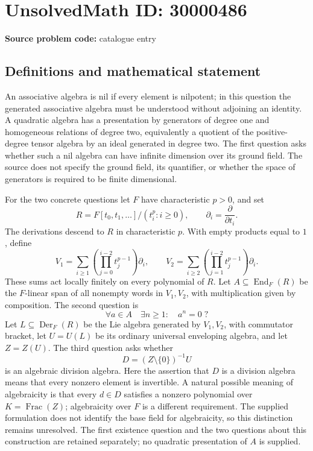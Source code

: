\documentclass[11pt]{article}
\begin{document}
\section*{UnsolvedMath ID: 30000486}
\textbf{Source problem code:} catalogue entry
\subsection{Definitions and mathematical statement}
An associative algebra is nil if every element is nilpotent; in this question the generated associative algebra must be understood without adjoining an identity. A quadratic algebra has a presentation by generators of degree one and homogeneous relations of degree two, equivalently a quotient of the positive-degree tensor algebra by an ideal generated in degree two. The first question asks whether such a nil algebra can have infinite dimension over its ground field. The source does not specify the ground field, its quantifier, or whether the space of generators is required to be finite dimensional.

For the two concrete questions let $F$ have characteristic $p>0$, and set
\[
R=F[t_0,t_1,\ldots]/(t_i^p:i\geq0),\qquad \partial_i=\frac{\partial}{\partial t_i}.
\]
The derivations descend to $R$ in characteristic $p$. With empty products equal to $1$, define
\[
V_1=\sum_{i\geq1}\left(\prod_{j=0}^{i-2}t_j^{p-1}\right)\partial_i,
\qquad
V_2=\sum_{i\geq2}\left(\prod_{j=1}^{i-2}t_j^{p-1}\right)\partial_i.
\]
These sums act locally finitely on every polynomial of $R$. Let $A\subseteq\operatorname{End}_F(R)$ be the $F$-linear span of all nonempty words in $V_1,V_2$, with multiplication given by composition. The second question is
\[
\forall a\in A\quad\exists n\geq1:\quad a^n=0\;?
\]
Let $L\subseteq\operatorname{Der}_F(R)$ be the Lie algebra generated by $V_1,V_2$, with commutator bracket, let $U=U(L)$ be its ordinary universal enveloping algebra, and let $Z=Z(U)$. The third question asks whether
\[
D=(Z\setminus\{0\})^{-1}U
\]
is an algebraic division algebra. Here the assertion that $D$ is a division algebra means that every nonzero element is invertible. A natural possible meaning of algebraicity is that every $d\in D$ satisfies a nonzero polynomial over $K=\operatorname{Frac}(Z)$; algebraicity over $F$ is a different requirement. The supplied formulation does not identify the base field for algebraicity, so this distinction remains unresolved. The first existence question and the two questions about this construction are retained separately; no quadratic presentation of $A$ is supplied.
\end{document}
